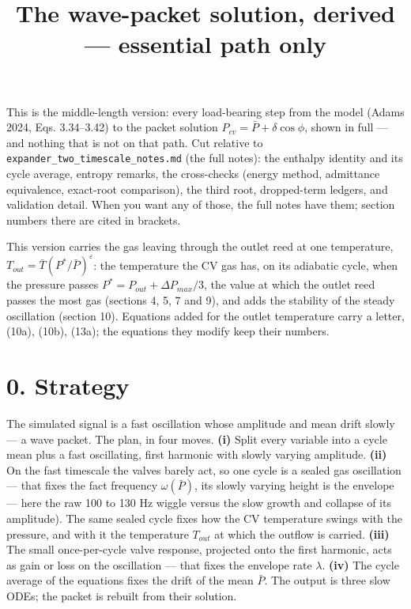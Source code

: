 \documentclass[11pt]{article}
\title{The wave-packet solution, derived --- essential path only}
\author{}
\date{}
\begin{document}
\maketitle
This is the middle-length version: every load-bearing step from the model (Adams 2024, Eqs. 3.34--3.42) to the packet solution $P_{cv} = \bar P + \delta\cos\phi$, shown in full --- and nothing that is not on that path. Cut relative to \texttt{expander\_two\_timescale\_notes.md} (the full notes): the enthalpy identity and its cycle average, entropy remarks, the cross-checks (energy method, admittance equivalence, exact-root comparison), the third root, dropped-term ledgers, and validation detail. When you want any of those, the full notes have them; section numbers there are cited in brackets.

This version carries the gas leaving through the outlet reed at one temperature, $T_{out} = \bar T(P^*/\bar P)^{\varepsilon}$: the temperature the CV gas has, on its adiabatic cycle, when the pressure passes $P^* = P_{out} + \Delta P_{max}/3$, the value at which the outlet reed passes the most gas (sections 4, 5, 7 and 9), and adds the stability of the steady oscillation (section 10). Equations added for the outlet temperature carry a letter, (10a), (10b), (13a); the equations they modify keep their numbers.

\section*{0. Strategy}

The simulated signal is a fast oscillation whose amplitude and mean drift slowly --- a wave packet. The plan, in four moves. \textbf{(i)} Split every variable into a cycle mean plus a fast oscillating, first harmonic with slowly varying amplitude. \textbf{(ii)} On the fast timescale the valves barely act, so one cycle is a sealed gas oscillation --- that fixes the fact frequency $\omega(\bar P)$, its slowly varying height is the envelope --- here the raw 100 to 130 Hz wiggle versus the slow growth and collapse of its amplitude). The same sealed cycle fixes how the CV temperature swings with the pressure, and with it the temperature $T_{out}$ at which the outflow is carried. \textbf{(iii)} The small once-per-cycle valve response, projected onto the first harmonic, acts as gain or loss on the oscillation --- that fixes the envelope rate $\lambda$. \textbf{(iv)} The cycle average of the equations fixes the drift of the mean $\bar P$. The output is three slow ODEs; the packet is rebuilt from their solution.
\end{document}
